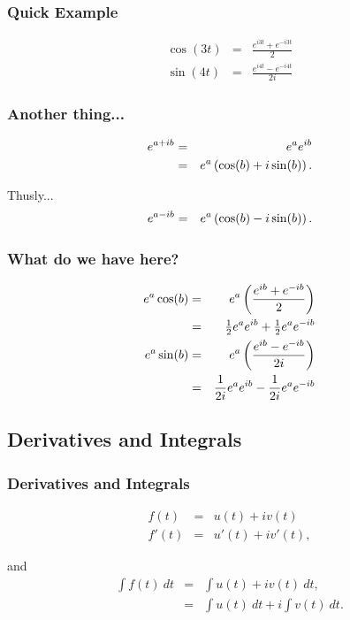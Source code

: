\begin{frame}
  \frametitle{Quick Example}

  \begin{eqnarray*}
    \cos(3t) & = & \frac{e^{i3t}+e^{-i3t}}{2} \\
    \sin(4t) & = & \frac{e^{i4t}-e^{-i4t}}{2i}
  \end{eqnarray*}

\end{frame}


\begin{frame}
  \frametitle{Another thing...}

  \begin{eqnarray*}
    e^{a+ib} & = & e^a e^{ib} \\
    & = & e^a \left( \cos(b) + i \sin(b) \right).
  \end{eqnarray*}

  Thusly...
  \begin{eqnarray*}
    e^{a-ib} & = & e^a \left( \cos(b) - i \sin(b) \right).
  \end{eqnarray*}

\end{frame}


\begin{frame}
  \frametitle{What do we have here?}

  \begin{eqnarray*}
    e^a \cos(b) & = & e^a \left( \frac{e^{ib}+e^{-ib}}{2} \right) \\
    & = & \mbox{$\frac{1}{2}$} e^a e^{ib} +\mbox{$\frac{1}{2}$} e^a  e^{-ib} \\
    e^a \sin(b) & = & e^a \left( \frac{e^{ib}-e^{-ib}}{2i} \right) \\
    & = & \frac{1}{2i} e^a e^{ib} - \frac{1}{2i} e^a e^{-ib}
  \end{eqnarray*}

\end{frame}

\subsection{Derivatives and Integrals}

\begin{frame}
  \frametitle{Derivatives and Integrals}

  \begin{eqnarray*}
    f(t) & = & u(t) + i v(t) \\
    f'(t) & = & u'(t) + i v'(t),
  \end{eqnarray*}

  and
  \begin{eqnarray*}
    \int f(t) ~ dt & = & \int u(t) + i v(t) ~ dt, \\
    & = & \int u(t) ~ dt + i \int v(t) ~ dt.
  \end{eqnarray*}

\end{frame}


